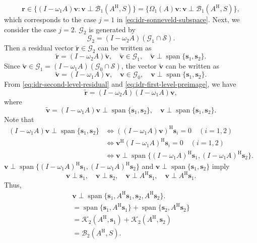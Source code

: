 \[\bm r\in\{(I-\omega_1A)\bm v:\bm v\perp\mathcal B_1(A^{\mathrm H},S)\}=\{\Omega_1(A)\bm v:\bm v\perp\mathcal B_1(A^{\mathrm H},S)\},\]
{which corresponds to the case $j=1$ in \eqref{eq:idr-sonneveld-subspace}.}
{Next, we consider the case $j=2$. $\mathcal G_2$ is generated by}
\[\mathcal G_2=(I-\omega_2A)(\mathcal G_1\cap\mathcal S).\]
{Then a residual vector $\widetilde{\bm r}\in\mathcal G_2$ can be written as}
\begin{equation}\label{eq:idr-second-level-residual}\widetilde{\bm r}=(I-\omega_2A)\widetilde{\bm v},\quad\widetilde{\bm v}\in\mathcal G_1,\quad\widetilde{\bm v}\perp\operatorname{span}\{\bm s_1,\bm s_2\}.\end{equation}
{Since $\widetilde{\bm v}\in\mathcal G_1=(I-\omega_1A)(\mathcal G_0\cap\mathcal S)$, the vector $\widetilde{\bm v}$ can be written as}
\begin{equation}\label{eq:idr-first-level-preimage}\widetilde{\bm v}=(I-\omega_1A)\bm v,\quad\bm v\in\mathcal G_0,\quad\bm v\perp\operatorname{span}\{\bm s_1,\bm s_2\}.\end{equation}
{From \eqref{eq:idr-second-level-residual} and \eqref{eq:idr-first-level-preimage}, we have}
\begin{equation}\label{eq:idr-two-factor-residual}\widetilde{\bm r}=(I-\omega_2A)(I-\omega_1A)\bm v,\end{equation}
{where}
\[\widetilde{\bm v}=(I-\omega_1A)\bm v\perp\operatorname{span}\{\bm s_1,\bm s_2\},\quad\bm v\perp\operatorname{span}\{\bm s_1,\bm s_2\}.\]
{Note that}
\[\begin{aligned}(I-\omega_1A)\bm v\perp\operatorname{span}\{\bm s_1,\bm s_2\}&\Leftrightarrow((I-\omega_1A)\bm v)^{\mathrm H}\bm s_i=0\quad(i=1,2)\\&\Leftrightarrow\bm v^{\mathrm H}(I-\omega_1A)^{\mathrm H}\bm s_i=0\quad(i=1,2)\\&\Leftrightarrow\bm v\perp\operatorname{span}\{(I-\omega_1A)^{\mathrm H}\bm s_1,(I-\omega_1A)^{\mathrm H}\bm s_2\}.\end{aligned}\]
{$\bm v\perp\operatorname{span}\{(I-\omega_1A)^{\mathrm H}\bm s_1,(I-\omega_1A)^{\mathrm H}\bm s_2\}$ and $\bm v\perp\operatorname{span}\{\bm s_1,\bm s_2\}$ imply}
\[\bm v\perp\bm s_1,\quad\bm v\perp\bm s_2,\quad\bm v\perp A^{\mathrm H}\bm s_1,\quad\bm v\perp A^{\mathrm H}\bm s_1.\]
{Thus,}
\[\begin{aligned}\bm v\perp\operatorname{span}\{\bm s_1,A^{\mathrm H}\bm s_1,\bm s_2,A^{\mathrm H}\bm s_2\}.\\=\operatorname{span}\{\bm s_1,A^{\mathrm H}\bm s_1\}+\operatorname{span}\{\bm s_2,A^{\mathrm H}\bm s_2\}\\=\mathcal K_2(A^{\mathrm H},\bm s_1)+\mathcal K_2(A^{\mathrm H},\bm s_2)\\=\mathcal B_2(A^{\mathrm H},S).\end{aligned}\]
